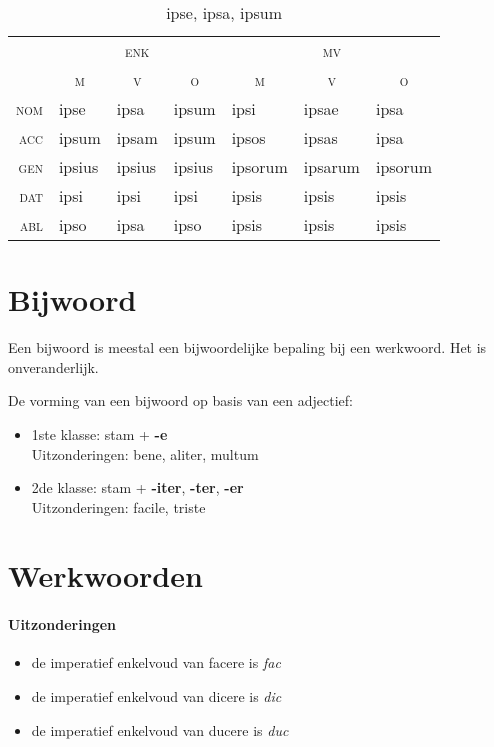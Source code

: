 \documentclass[12pt,a4paper]{article}
\begin{document}
\begin{table}[H]
\centering
\begin{tabular}{ r | l l l | l l l }
\toprule
 & \multicolumn{3}{c|}{\textsc{enk}} & \multicolumn{3}{c}{\textsc{mv}} \\
 & \multicolumn{1}{c}{\textsc{m}} & \multicolumn{1}{c}{\textsc{v}} & \multicolumn{1}{c|}{\textsc{o}} & \multicolumn{1}{c}{\textsc{m}} & \multicolumn{1}{c}{\textsc{v}} & \multicolumn{1}{c}{\textsc{o}} \\ 
\midrule
\textsc{nom} & ipse   & ipsa   & ipsum  & ipsi    & ipsae   & ipsa  \\
\textsc{acc} & ipsum  & ipsam  & ipsum  & ipsos   & ipsas   & ipsa  \\
\textsc{gen} & ipsius & ipsius & ipsius & ipsorum & ipsarum & ipsorum \\
\textsc{dat} & ipsi   & ipsi   & ipsi   & ipsis   & ipsis   & ipsis   \\
\textsc{abl} & ipso   & ipsa   & ipso   & ipsis   & ipsis   & ipsis   \\
\bottomrule
\end{tabular}
\caption{ipse, ipsa, ipsum}
\label{tab:ipse}
\end{table}

\section{Bijwoord}

Een bijwoord is meestal een bijwoordelijke bepaling bij een werkwoord. Het is onveranderlijk.

De vorming van een bijwoord op basis van een adjectief:
\begin{itemize}
    \item 1ste klasse: stam + \textbf{-e} \\
    Uitzonderingen: bene, aliter, multum
    \item 2de klasse: stam + \textbf{-iter}, \textbf{-ter}, \textbf{-er} \\
    Uitzonderingen: facile, triste
\end{itemize}

\section{Werkwoorden}

\paragraph{Uitzonderingen}
\begin{itemize}
	\item de imperatief enkelvoud van facere is \emph{fac}
	\item de imperatief enkelvoud van dicere is \emph{dic}
	\item de imperatief enkelvoud van ducere is \emph{duc}
\end{itemize}
\end{document}
